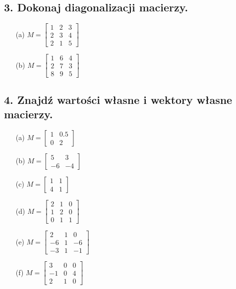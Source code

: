 \subsection*{3. Dokonaj diagonalizacji macierzy.}

\begin{enumerate}
    \item[(a)] \( M = \begin{bmatrix} 1 & 2 & 3 \\ 2 & 3 & 4 \\ 2 & 1 & 5 \end{bmatrix} \)
    
    \item[(b)] \( M = \begin{bmatrix} 1 & 6 & 4 \\ 2 & 7 & 3 \\ 8 & 9 & 5 \end{bmatrix} \)
\end{enumerate}

\subsection*{4. Znajdź wartości własne i wektory własne macierzy.}

\begin{enumerate}
    \item[(a)] \( M = \begin{bmatrix} 1 & 0.5 \\ 0 & 2 \end{bmatrix} \)
    
    \item[(b)] \( M = \begin{bmatrix} 5 & 3 \\ -6 & -4 \end{bmatrix} \)
    
    \item[(c)] \( M = \begin{bmatrix} 1 & 1 \\ 4 & 1 \end{bmatrix} \)
    
    \item[(d)] \( M = \begin{bmatrix} 2 & 1 & 0 \\ 1 & 2 & 0 \\ 0 & 1 & 1 \end{bmatrix} \)
    
    \item[(e)] \( M = \begin{bmatrix} 2 & 1 & 0 \\ -6 & 1 & -6 \\ -3 & 1 & -1 \end{bmatrix} \)
    
    \item[(f)] \( M = \begin{bmatrix} 3 & 0 & 0 \\ -1 & 0 & 4 \\ 2 & 1 & 0 \end{bmatrix} \)
\end{enumerate}

